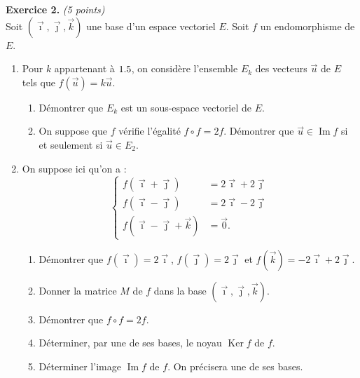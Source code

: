 \smallskip
\noindent\textbf{Exercice 2.} \hfill\textit{(5 points)}\\
Soit $(\vec\imath,\vec\jmath,\vec k)$ une base d'un espace vectoriel $E$. Soit $f$ un endomorphisme de $E$.
\begin{enumerate}[label=\arabic*)]
\item Pour $k$ appartenant à $1.5$, on considère l'ensemble $E_k$ des vecteurs $\vec u$ de $E$
  tels que $f(\vec u)=k\vec u$.
  \begin{enumerate}[label=\textbf{\alph*.}]
  \item Démontrer que $E_k$ est un sous-espace vectoriel de $E$.
  \item On suppose que $f$ vérifie l'égalité $f\circ f=2f$. Démontrer que $\vec u\in\operatorname{Im}f$
    si et seulement si $\vec u\in E_2$.
  \end{enumerate}
\item On suppose ici qu'on a :
  \[
  \left\{\begin{aligned}
  f(\vec\imath+\vec\jmath)&=2\vec\imath+2\vec\jmath\\
  f(\vec\imath-\vec\jmath)&=2\vec\imath-2\vec\jmath\\
  f(\vec\imath-\vec\jmath+\vec k)&=\vec 0.
  \end{aligned}\right.
  \]
  \begin{enumerate}[label=\textbf{\alph*.}]
  \item Démontrer que $f(\vec\imath)=2\vec\imath$, $f(\vec\jmath)=2\vec\jmath$ et $f(\vec k)=-2\vec\imath+2\vec\jmath$.
  \item Donner la matrice $M$ de $f$ dans la base $(\vec\imath,\vec\jmath,\vec k)$.
  \item Démontrer que $f\circ f=2f$.
  \item Déterminer, par une de ses bases, le noyau $\operatorname{Ker}f$ de $f$.
  \item Déterminer l'image $\operatorname{Im}f$ de $f$. On précisera une de ses bases.
  \end{enumerate}
\end{enumerate}

